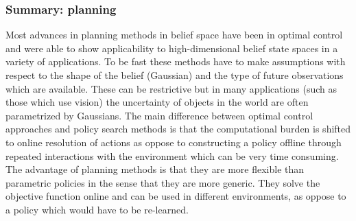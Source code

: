 \subsubsection{Summary: planning}

Most advances in planning methods in belief space have been in optimal control and were able to show 
applicability to high-dimensional belief state spaces in a variety of applications. To be fast these methods have to make assumptions with respect to the shape of the belief (Gaussian) and the type of future observations which are available. These can 
be restrictive but in many applications (such as those which use vision) the uncertainty of objects in the world are 
often parametrized by Gaussians. The main difference between optimal control approaches and policy search 
methods is that the computational burden is shifted to online resolution of actions as oppose to constructing a policy offline through repeated 
interactions with the environment which can be very time consuming. The advantage of planning methods is that they 
are more flexible than parametric policies in the sense that they are more generic. They solve the objective function online and
can be used in different environments, as oppose to a policy which would have to be re-learned.


